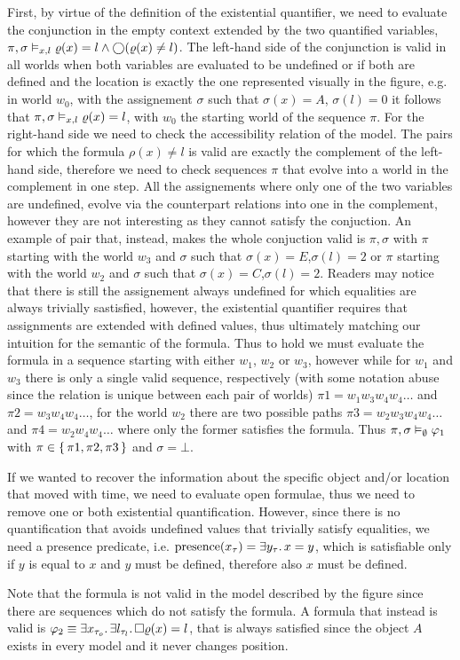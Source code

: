 First, by virtue of the definition of the existential quantifier, we need to evaluate the conjunction in the empty context extended by the two quantified variables, ${\pi}, {\sigma} \vDash_{x,l} {\varrho(x) = l \land \bigcirc{(\varrho(x) \neq l)}}$.
The left-hand side of the conjunction is valid in all worlds when both variables are evaluated to be undefined or if both are defined and the location is exactly the one represented visually in the figure, e.g. in world $w_0$, with the assignement $\sigma$ such that $\sigma(x) = A$, $\sigma(l) = 0$ it follows that ${\pi}, {\sigma} \vDash_{x,l} {\varrho(x) = l}$, with $w_0$ the starting world of the sequence $\pi$.
For the right-hand side we need to check the accessibility relation of the model. The pairs for which the formula $\rho(x) \neq l$ is valid are exactly the complement of the left-hand side, therefore we need to check sequences $\pi$ that evolve into a world in the complement in one step.
All the assignements where only one of the two variables are undefined, evolve via the counterpart relations into one in the complement, however they are not interesting as they cannot satisfy the conjuction.
An example of pair that, instead, makes the whole conjuction valid is $\pi, \sigma$ with $\pi$ starting with the world
$w_3$ and $\sigma$ such that $\sigma(x) = E$,$\sigma(l) = 2$ or $\pi$ starting with the world $w_2$ and $\sigma$ such
that $\sigma(x) = C$,$\sigma(l) = 2$.
Readers may notice that there is still the assignement always undefined for which equalities are always trivially sastisfied, however, the existential quantifier requires that assignments are extended with defined values, thus ultimately matching our intuition for the semantic of the formula.
Thus to hold we must evaluate the formula in a sequence starting with either $w_1$, $w_2$ or $w_3$, however while for
$w_1$ and $w_3$ there is only a single valid sequence, respectively (with some notation abuse since the relation is
unique between each pair of worlds) $\pi1 = w_1w_3w_4w_4\ldots$ and $\pi2 = w_3w_4w_4\ldots$, for the world $w_2$ there
are two possible paths $\pi3 = w_2w_3w_4w_4\ldots$ and $\pi4 = w_2w_4w_4\ldots$ where only the former satisfies the
formula. Thus ${\pi}, {\sigma} \vDash_{\emptyset} {\varphi_1}$ with $\pi \in \set{\pi1, \pi2, \pi3}$ and $\sigma = \bot$.

If we wanted to recover the information about the specific object and/or location that moved with time, we need to evaluate open
formulae, thus we need to remove one or both existential quantification. However, since there is no quantification that
avoids undefined values that trivially satisfy equalities, we need a presence predicate, i.e. $\text{presence}(x_\tau) =
\exists {y_\tau} \ldotp {x = y}$, which is satisfiable only if $y$ is equal to $x$ and $y$ must be defined, therefore
also $x$ must be defined.

Note that the formula is not valid in the model described by the figure since there are sequences which do not satisfy
the formula. A formula that instead is valid is $\varphi_2 \equiv \exists {x_{\tau_o}} \ldotp {\exists {l_{\tau_l}} \ldotp {\Box{\varrho(x)
= l}}}$, that is always satisfied since the object $A$ exists in every model and it never changes position.
